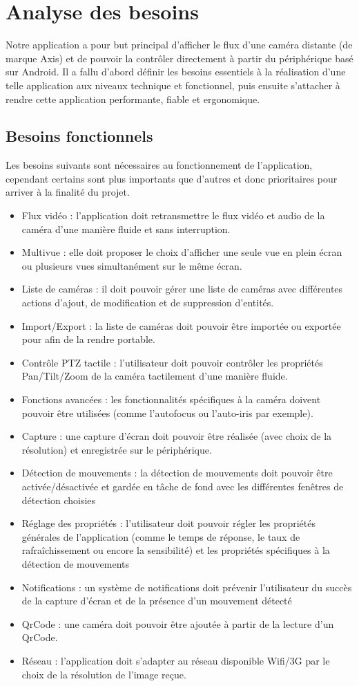 \chapter{Analyse des besoins}
Notre application a pour but principal d'afficher le flux d'une caméra distante (de marque Axis) et de pouvoir la contrôler directement à partir du périphérique basé sur Android.
Il a fallu d'abord définir les besoins essentiels à la réalisation d'une telle application aux niveaux technique et fonctionnel, puis ensuite s'attacher à rendre cette application
performante, fiable et ergonomique.

\section{Besoins fonctionnels}
Les besoins suivants sont nécessaires au fonctionnement de l'application, cependant certains sont plus importants que d'autres et donc prioritaires pour arriver à la finalité du projet.
\begin{itemize}
  \item Flux vidéo : l'application doit retransmettre le flux vidéo et audio de
  la caméra d'une manière fluide et sans interruption.
  \item Multivue : elle doit proposer le choix d'afficher une seule vue en plein écran ou plusieurs vues simultanément sur le même écran.
  \item Liste de caméras : il doit pouvoir gérer une liste de caméras avec différentes actions d'ajout, de modification et de suppression d'entités.
  \item Import/Export : la liste de caméras doit pouvoir être importée ou exportée pour afin de la rendre portable.
  \item Contrôle PTZ tactile : l'utilisateur doit pouvoir contrôler les propriétés Pan/Tilt/Zoom de la caméra tactilement d'une manière fluide.
  \item Fonctions avancées : les fonctionnalités spécifiques à la caméra doivent pouvoir être utilisées (comme l'autofocus ou l'auto-iris par exemple).
  \item Capture : une capture d'écran doit pouvoir être réalisée (avec choix de la résolution) et enregistrée sur le périphérique.
  \item Détection de mouvements : la détection de mouvements doit pouvoir être activée/désactivée et gardée en tâche de fond avec les différentes fenêtres de détection choisies
  \item Réglage des propriétés : l'utilisateur doit pouvoir régler les propriétés générales de l'application (comme le temps de réponse, le taux de rafraîchissement ou encore la sensibilité) et les propriétés spécifiques à la détection de mouvements
  \item Notifications : un système de notifications doit prévenir l'utilisateur du succès de la capture d'écran et de la présence d'un mouvement détecté 
  \item QrCode : une caméra doit pouvoir être ajoutée à partir de la lecture d'un QrCode.
  \item Réseau : l'application doit s'adapter au réseau disponible Wifi/3G par le choix de la résolution de l'image reçue.
\end{itemize}

